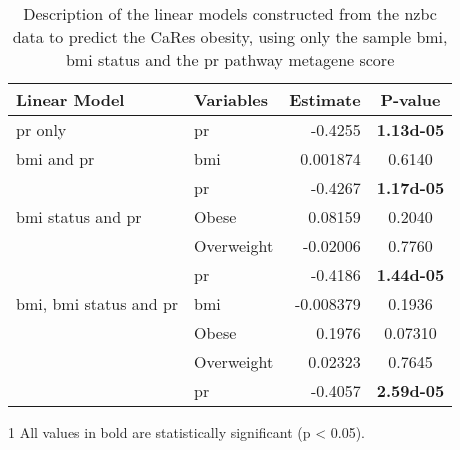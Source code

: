 	\begin{table}[htpb]
		\centering
		\caption[Description of the linear models constructed from the \gls{nzbc} data to predict the CaRes obesity, using only the sample \gls{bmi}, \gls{bmi} status and the \acrshort{pr} pathway metagene score]{Description of the linear models constructed from the \gls{nzbc} data to predict the CaRes obesity, using only the sample \gls{bmi}, \gls{bmi} status and the \gls{pr} pathway metagene score}
		\label{tab:lm_pr_only_cares}
		\begin{threeparttable}
			\begin{tabular}{llrc}
				Linear Model & Variables & Estimate & {P-value}\\
					\hline
					\hline
					\rule{0pt}{2.25ex}\gls{pr} only                            & \gls{pr}   & -0.4255   & \bfseries \num{1.13d-05} \tnote{1}\\
					\hline
					\rule{0pt}{2.25ex}\gls{bmi} and \gls{pr}                   & \gls{bmi}  & 0.001874  & 0.6140   \\
                                                                               & \gls{pr}   & -0.4267   & \bfseries \num{1.17d-05} \\
					\hline
					\rule{0pt}{2.25ex}\gls{bmi} status and \gls{pr}            & Obese      & 0.08159   & 0.2040   \\
                                                                               & Overweight & -0.02006  & 0.7760   \\
                                                                               & \gls{pr}   & -0.4186   & \bfseries \num{1.44d-05} \\
					\hline
					\rule{0pt}{2.25ex}\gls{bmi}, \gls{bmi} status and \gls{pr} & \gls{bmi}  & -0.008379 & 0.1936   \\
                                                                               & Obese      & 0.1976    & 0.07310  \\
                                                                               & Overweight & 0.02323   & 0.7645   \\
                                                                               & \gls{pr}   & -0.4057   & \bfseries \num{2.59d-05} \\
					\hline
					\hline
			\end{tabular}
				\begin{tablenotes}
					\begin{footnotesize}
					\item [1] All values in bold are statistically significant (p \textless{} 0.05).
					\end{footnotesize}
				\end{tablenotes}
		\end{threeparttable}
	\end{table}

